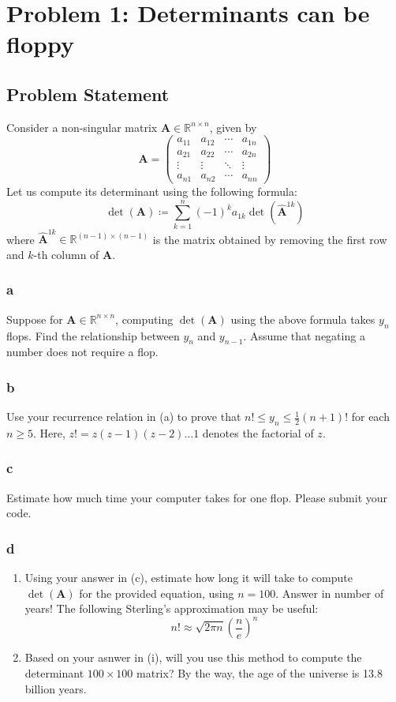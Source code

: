 \documentclass[11pt]{report}
\theoremstyle{definition}
\newcommand{\mat}[1]{\mathbf{#1}}
\begin{document}
\section*{Problem 1: Determinants can be floppy}
\subsection*{Problem Statement}
Consider a non-singular matrix $\mat{A}\in\mathbb{R}^{n\times n}$, given by
\begin{equation}
	\mat{A} = \begin{pmatrix}
		a_{11} & a_{12} & \cdots & a_{1n} \\
		a_{21} & a_{22} & \cdots & a_{2n} \\
		\vdots & \vdots & \ddots & \vdots \\
		a_{n1} & a_{n2} & \cdots & a_{nn}
	\end{pmatrix}
\end{equation}
Let us compute its determinant using the following formula:
\[\det(\mat{A}) \coloneqq \sum_{k=1}^{n}(-1)^ka_{1k}\det(\widehat{\mat{A}}^{1k})\]
where $\widehat{\mat{A}}^{1k}\in\mathbb{R}^{(n-1)\times(n-1)}$ is the matrix
obtained by removing the first row and $k$-th column of $\mat{A}$.

\subsubsection*{a}
Suppose for $\mat{A}\in\mathbb{R}^{n\times n}$, computing $\det(\mat{A})$ using the above
formula takes $y_n$ flops. Find the relationship between $y_n$ and $y_{n-1}$. Assume that
negating a number does not require  a flop.

\subsubsection*{b}
Use your recurrence relation in (a) to prove that $n!\leq y_n\leq \frac{1}{2}(n+1)!$ for
each $n\geq 5$. Here, $z!=z(z-1)(z-2)\ldots1$ denotes the factorial of $z$.

\subsubsection*{c}
Estimate how much time your computer takes for one flop. Please submit your code.

\subsubsection*{d}
\begin{enumerate}
	\item Using your answer in (c), estimate how long it will take to compute
	      $\det(\mat{A})$ for the provided equation, using $n=100$. Answer in number
	      of years! The following Sterling's approximation may be useful:
	      \[n! \approx \sqrt{2\pi n}\left(\frac{n}{e}\right)^n\]
	\item Based on your asnwer in (i), will you use this method to compute the
	      determinant $100\times 100$ matrix? By the way, the age of the universe is
	      13.8 billion years.

\end{enumerate}
\end{document}
